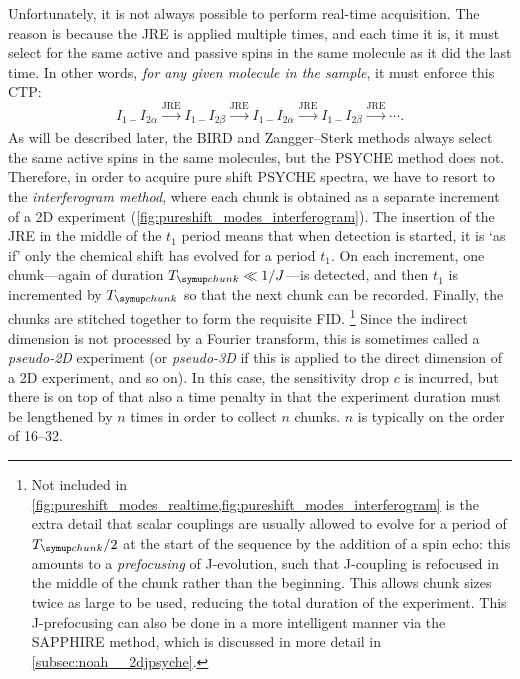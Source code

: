 Unfortunately, it is not always possible to perform real-time acquisition.
The reason is because the JRE is applied multiple times, and each time it is, it must select for the same active and passive spins in the same molecule as it did the last time.
In other words, \textit{for any given molecule in the sample}, it must enforce this CTP:
\begin{equation}
    \label{eq:real_time_pureshift}
    I_{1-}I_{2\alpha} \xrightarrow[]{\text{JRE}} I_{1-}I_{2\beta} \xrightarrow[]{\text{JRE}} I_{1-}I_{2\alpha} \xrightarrow[]{\text{JRE}} I_{1-}I_{2\beta} \xrightarrow[]{\text{JRE}} \cdots .
\end{equation}
As will be described later, the BIRD and Zangger--Sterk methods always select the same active spins in the same molecules, but the PSYCHE method does not.
Therefore, in order to acquire pure shift PSYCHE spectra, we have to resort to the \textit{interferogram method}, where each chunk is obtained as a separate increment of a 2D experiment (\cref{fig:pureshift_modes_interferogram}).
The insertion of the JRE in the middle of the $t_1$ period means that when detection is started, it is `as if' only the chemical shift has evolved for a period $t_1$.
On each increment, one chunk---again of duration $\Tchunk \ll 1/J$---is detected, and then $t_1$ is incremented by $\Tchunk$ so that the next chunk can be recorded.
Finally, the chunks are stitched together to form the requisite FID.%
\footnote{Not included in \cref{fig:pureshift_modes_realtime,fig:pureshift_modes_interferogram} is the extra detail that scalar couplings are usually allowed to evolve for a period of $\Tchunk/2$ at the start of the sequence by the addition of a spin echo: this amounts to a \textit{prefocusing} of J-evolution, such that J-coupling is refocused in the middle of the chunk rather than the beginning\autocite{Aguilar2010ACIE}.
This allows chunk sizes twice as large to be used, reducing the total duration of the experiment.
This J-prefocusing can also be done in a more intelligent manner via the SAPPHIRE method\autocite{Moutzouri2017CC}, which is discussed in more detail in \cref{subsec:noah__2djpsyche}.}
Since the indirect dimension is not processed by a Fourier transform, this is sometimes called a \textit{pseudo-2D} experiment (or \textit{pseudo-3D} if this is applied to the direct dimension of a 2D experiment, and so on).
In this case, the sensitivity drop $c$ is incurred, but there is on top of that also a time penalty in that the experiment duration must be lengthened by $n$ times in order to collect $n$ chunks.
$n$ is typically on the order of 16--32.

